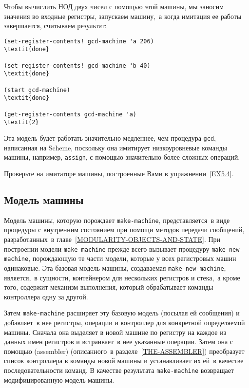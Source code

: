 Чтобы вычислить НОД двух чисел с помощью этой машины, мы
заносим значения во входные регистры, запускаем машину,~а когда
имитация ее работы завершается, считываем результат:

\begin{Verbatim}[fontsize=\small]
(set-register-contents! gcd-machine 'a 206)
\textit{done}

(set-register-contents! gcd-machine 'b 40)
\textit{done}

(start gcd-machine)
\textit{done}

(get-register-contents gcd-machine 'a)
\textit{2}
\end{Verbatim}
Эта модель будет работать значительно медленнее, чем процедура
{\tt gcd}, написанная на Scheme, поскольку она имитирует
низкоуровневые команды машины, например, {\tt assign}, с помощью
значительно более сложных операций.
\begin{exercise}{5.7}%
\label{EX5.7}%
Проверьте на имитаторе машины, построенные Вами в
упражнении~\ref{EX5.4}.
\end{exercise}

\subsection{Модель машины}
\label{THE-MACHINE-MODEL}


Модель машины, которую порождает
{\tt make-machine}, представляется~в виде процедуры с
внутренним состоянием при помощи методов передачи сообщений,
разработанных~в главе~\ref{MODULARITY-OBJECTS-AND-STATE}. При построении модели
{\tt make-machine} прежде всего вызывает процедуру
{\tt make-new-machine},  порождающую те части модели,
которые у всех регистровых машин одинаковые.  Эта базовая модель
машины, создаваемая {\tt make-new-machine}, является,~в сущности,
контейнером для нескольких регистров и стека,~а кроме того, содержит механизм
выполнения, который обрабатывает команды контроллера одну за
другой.

Затем {\tt make-machine} расширяет эту базовую
модель (посылая ей сообщения) и добавляет~в нее регистры, операции и
контроллер для конкретной определяемой машины.  Сначала она выделяет в
новой машине по регистру на каждое из данных имен регистров и
встраивает~в нее указанные операции.  Затем она с помощью 
 (assembler)
(описанного~в 
разделе~\ref{THE-ASSEMBLER}) преобразует список контроллера
в команды новой машины и устанавливает их ей~в качестве последовательности
команд.  В качестве результата {\tt make-machine} возвращает
модифицированную модель машины.

